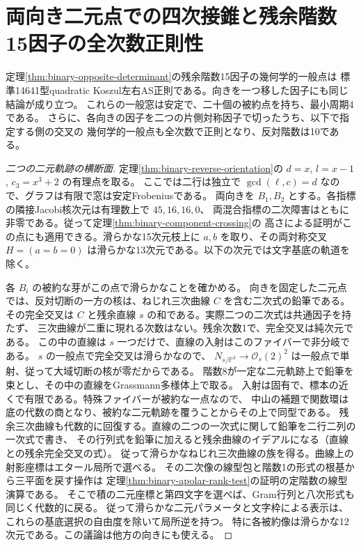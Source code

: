 \section{両向き二元点での四次接錐と残余階数15因子の全次数正則性}
\label{sec:double-binary-residual-regularity}
\begin{theorem}\label{thm:double-binary-residual-regularity}
定理\ref{thm:binary-opposite-determinant}の残余階数15因子の幾何学的一般点は
標準14641型quadratic Koszul左右AS正則である。向きを一つ移した因子にも同じ結論が成り立つ。
これらの一般窓は安定で、二十個の被約点を持ち、最小周期4である。
さらに、各向きの因子を二つの片側対称因子で切ったうち、以下で指定する側の交叉の
幾何学的一般点も全次数で正則となり、反対階数は10である。
\end{theorem}
\begin{proof}[二つの二元軌跡の横断面]
定理\ref{thm:binary-reverse-orientation}の $d=x$, $l=x-1$, $c_3=x^3+2$ の有理点を取る。
ここでは二行は独立で $\gcd(\ell,c)=d$ なので、グラフは有限で窓は安定Frobeniusである。
両向きを $B_1,B_2$ とする。各指標の隣接Jacobi核次元は有理数上で $45,16,16,0$、
両混合指標の二次障害はともに非零である。従って定理\ref{thm:binary-component-crossing}の
高さによる証明がこの点にも適用できる。滑らかな15次元枝上に $a,b$ を取り、その両対称交叉
$H=(a=b=0)$ は滑らかな13次元である。以下の次元では文字基底の軌道を除く。

各 $B_i$ の被約な芽がこの点で滑らかなことを確かめる。
向きを固定した二元点では、反対切断の一方の核は、ねじれ三次曲線 $C$ を含む二次式の鉛筆である。
その完全交叉は $C$ と残余直線 $s$ の和である。実際二つの二次式は共通因子を持たず、
三次曲線が二重に現れる次数はない。残余次数1で、完全交叉は純次元である。
この中の直線は $s$ 一つだけで、直線の入射はこのファイバーで非分岐である。
$s$ の一般点で完全交叉は滑らかなので、
$N_{s/\mathbb P^3}\to\mathcal O_s(2)^2$ は一般点で単射、従って大域切断の核が零だからである。
階数8が一定な二元軌跡上で鉛筆を束とし、その中の直線をGrassmann多様体上で取る。
入射は固有で、標本の近くで有限である。特殊ファイバーが被約な一点なので、
中山の補題で関数環は底の代数の商となり、被約な二元軌跡を覆うことからその上で同型である。
残余三次曲線も代数的に回復する。直線の二つの一次式に関して鉛筆を二行二列の一次式で書き、
その行列式を鉛筆に加えると残余曲線のイデアルになる（直線との残余完全交叉の式）。
従って滑らかなねじれ三次曲線の族を得る。曲線上の射影座標はエタール局所で選べる。
その二次像の線型包と階数1の形式の根基から三平面を戻す操作は
定理\ref{thm:binary-apolar-rank-test}の証明の定階数の線型演算である。
そこで積の二元座標と第四文字を選べば、Gram行列と八次形式も同じく代数的に戻る。
従って滑らかな二元パラメータと文字枠による表示は、これらの基底選択の自由度を除いて局所逆を持つ。
特に各被約像は滑らかな12次元である。この議論は他方の向きにも使える。


\end{proof}
